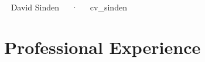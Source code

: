 \documentclass[11pt, a4paper]{awesome-cv}
\begin{document}

\makecvheader

\makecvfooter
  {~}
    {David Sinden~~~·~~~cv\_sinden}
  {\thepage}



\hypertarget{research-positions}{\section{Professional Experience}\label{professional-experience}}
\end{document}
